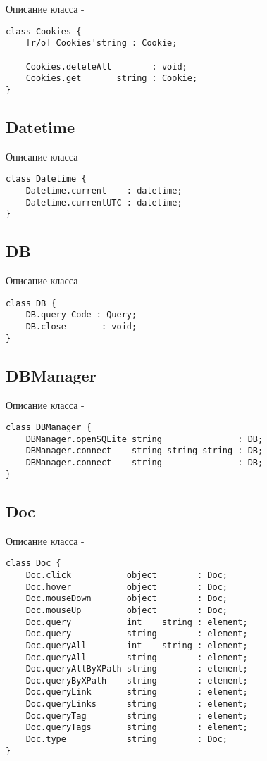 \noindent Описание класса  -
\begin{lstlisting}[numbers=none]
class Cookies {
    [r/o] Cookies'string : Cookie;

    Cookies.deleteAll        : void;
	Cookies.get       string : Cookie;
}
\end{lstlisting}

\subsection{{\color{orange} Datetime}}

\noindent Описание класса  -
\begin{lstlisting}[numbers=none]
class Datetime {
	Datetime.current    : datetime;
	Datetime.currentUTC : datetime;
}
\end{lstlisting}

\subsection{{\color{orange} DB}}

\noindent Описание класса  -
\begin{lstlisting}[numbers=none]
class DB {
	DB.query Code : Query;
	DB.close       : void;
}
\end{lstlisting}

\subsection{{\color{orange} DBManager}}

\noindent Описание класса  -
\begin{lstlisting}[numbers=none]
class DBManager {
    DBManager.openSQLite string               : DB;
    DBManager.connect    string string string : DB;
    DBManager.connect    string               : DB;
}
\end{lstlisting}

\subsection{{\color{orange} Doc}}

\noindent Описание класса  -
\begin{lstlisting}[numbers=none]
class Doc {
	Doc.click           object        : Doc;
	Doc.hover           object        : Doc;
	Doc.mouseDown       object        : Doc;
	Doc.mouseUp         object        : Doc;
    Doc.query           int    string : element;
	Doc.query           string        : element;
	Doc.queryAll        int    string : element;
	Doc.queryAll        string        : element;
	Doc.queryAllByXPath string        : element;
	Doc.queryByXPath    string        : element;
	Doc.queryLink       string        : element;
	Doc.queryLinks      string        : element;
	Doc.queryTag        string        : element;
	Doc.queryTags       string        : element;
	Doc.type            string        : Doc;
}
\end{lstlisting}

